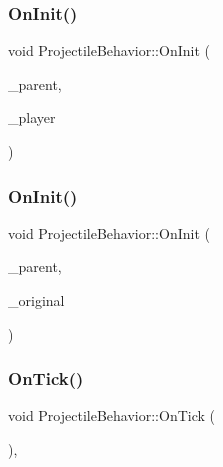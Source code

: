 \subsubsection{\texorpdfstring{On\+Init()}{OnInit()}\hspace{0.1cm}{\footnotesize\ttfamily [1/2]}}
{\footnotesize\ttfamily void Projectile\+Behavior\+::\+On\+Init (\begin{DoxyParamCaption}\item[{std\+::weak\+\_\+ptr$<$ \hyperlink{classfrontier_1_1_entity}{frontier\+::\+Entity} $>$}]{\+\_\+parent,  }\item[{std\+::weak\+\_\+ptr$<$ \hyperlink{classfrontier_1_1_entity}{frontier\+::\+Entity} $>$}]{\+\_\+player }\end{DoxyParamCaption})}

\mbox{\label{class_projectile_behavior_a5e356eb4a161e7784c50b14ba39d98d1}} 
\subsubsection{\texorpdfstring{On\+Init()}{OnInit()}\hspace{0.1cm}{\footnotesize\ttfamily [2/2]}}
{\footnotesize\ttfamily void Projectile\+Behavior\+::\+On\+Init (\begin{DoxyParamCaption}\item[{std\+::weak\+\_\+ptr$<$ \hyperlink{classfrontier_1_1_entity}{frontier\+::\+Entity} $>$}]{\+\_\+parent,  }\item[{std\+::weak\+\_\+ptr$<$ \hyperlink{class_projectile_behavior}{Projectile\+Behavior} $>$}]{\+\_\+original }\end{DoxyParamCaption})}

\mbox{\label{class_projectile_behavior_a7756651ba998e7f3c0abcafcf25796ae}} 
\subsubsection{\texorpdfstring{On\+Tick()}{OnTick()}}
{\footnotesize\ttfamily void Projectile\+Behavior\+::\+On\+Tick (\begin{DoxyParamCaption}{ }\end{DoxyParamCaption})\hspace{0.3cm}{\ttfamily [override]}, {\ttfamily [virtual]}}



